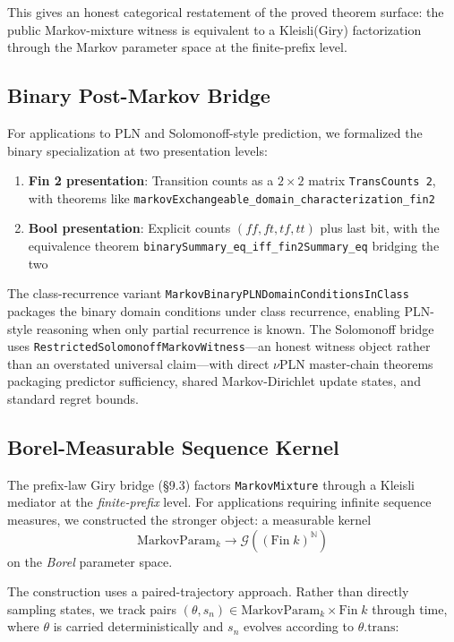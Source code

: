 \documentclass[11pt,a4paper]{article}
\theoremstyle{definition}
\begin{document}
This gives an honest categorical restatement of the proved theorem surface:
the public Markov-mixture witness is equivalent to a Kleisli(Giry)
factorization through the Markov parameter space at the finite-prefix level.

\subsection{Binary Post-Markov Bridge}

For applications to PLN and Solomonoff-style prediction, we formalized the
binary specialization at two presentation levels:

\begin{enumerate}
\item \textbf{Fin 2 presentation}: Transition counts as a $2 \times 2$ matrix
  \texttt{TransCounts 2}, with theorems like
  \texttt{markovExchangeable\_domain\_characterization\_fin2}
\item \textbf{Bool presentation}: Explicit counts $(ff,ft,tf,tt)$ plus last bit,
  with the equivalence theorem
  \texttt{binarySummary\_eq\_iff\_fin2Summary\_eq} bridging the two
\end{enumerate}

The class-recurrence variant \texttt{MarkovBinaryPLNDomainConditionsInClass}
packages the binary domain conditions under class recurrence, enabling
PLN-style reasoning when only partial recurrence is known. The Solomonoff
bridge uses \texttt{RestrictedSolomonoffMarkovWitness}---an honest witness
object rather than an overstated universal claim---with direct $\nu$PLN
master-chain theorems packaging predictor sufficiency, shared Markov-Dirichlet
update states, and standard regret bounds.

\subsection{Borel-Measurable Sequence Kernel}

The prefix-law Giry bridge (\S9.3) factors \texttt{MarkovMixture} through a
Kleisli mediator at the \emph{finite-prefix} level. For applications requiring
infinite sequence measures, we constructed the stronger object: a measurable
kernel
\[
\mathrm{MarkovParam}_k \to \mathcal{G}((\mathrm{Fin}\;k)^{\mathbb{N}})
\]
on the \emph{Borel} parameter space.

The construction uses a paired-trajectory approach. Rather than directly
sampling states, we track pairs $(\theta, s_n) \in \mathrm{MarkovParam}_k
\times \mathrm{Fin}\;k$ through time, where $\theta$ is carried deterministically
and $s_n$ evolves according to $\theta.\mathrm{trans}$:
\end{document}
